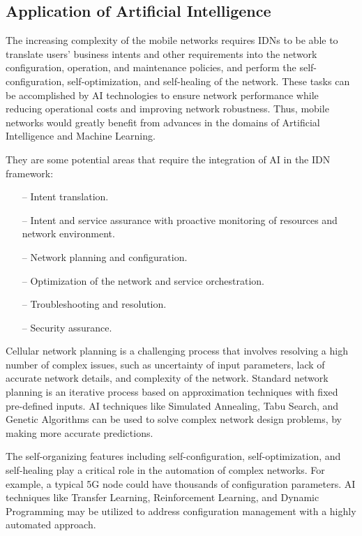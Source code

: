 \subsection{Application of Artificial Intelligence}
The increasing complexity of the mobile networks requires IDNs to be able to translate users' business intents and other requirements into the network configuration, operation, and maintenance policies, and perform the self-configuration, self-optimization, and self-healing of the network. These tasks can be accomplished by AI technologies to ensure network performance while reducing operational costs and improving network robustness. Thus, mobile networks would greatly benefit from advances in the domains of Artificial Intelligence and Machine Learning.\cite{Wei2020}

They are some potential areas that require the integration of AI in the IDN framework:
\begin{itemize}
\item[--] Intent translation.
\item[--] Intent and service assurance with proactive monitoring of resources and network environment.
\item[--] Network planning and configuration.
\item[--] Optimization of the network and service orchestration.
\item[--] Troubleshooting and resolution.
\item[--] Security assurance.
\end{itemize}

Cellular network planning is a challenging process that involves resolving a high number of complex issues, such as uncertainty of input parameters, lack of accurate network details, and complexity of the network. Standard network planning is an iterative process based on approximation techniques with fixed pre-defined inputs. AI techniques like Simulated Annealing, Tabu Search, and Genetic Algorithms can be used to solve complex network design problems, by making more accurate predictions.\cite{anuradha2017empowering}

The self-organizing features including self-configuration, self-optimization, and self-healing play a critical role in the automation of complex networks. For example, a typical 5G node could have thousands of configuration parameters. AI techniques like Transfer Learning, Reinforcement Learning, and Dynamic Programming may be utilized to address configuration management with a highly automated approach.\cite{anuradha2017empowering}

